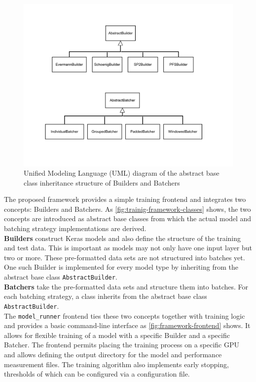 \begin{figure}
    \centering
    \includegraphics[width=\textwidth]{gfx/training-framework-classes.pdf}
    \caption[UML diagram of the framework classes]{Unified Modeling Language (UML) diagram of the abstract base class inheritance structure of Builders and Batchers}
    \label{fig:trainig-framework-classes}
\end{figure}

The proposed framework provides a simple training frontend and integrates two concepts: Builders and Batchers. As \autoref{fig:trainig-framework-classes} shows, the two concepts are introduced as abstract base classes from which the actual model and batching strategy implementations are derived.\\

\noindent\textbf{Builders} construct Keras models and also define the structure of the training and test data. This is important as models may not only have one input layer but two or more. These pre-formatted data sets are not structured into batches yet. One such Builder is implemented for every model type by inheriting from the abstract base class \verb=AbstractBuilder=.\\

\noindent\textbf{Batchers} take the pre-formatted data sets and structure them into batches. For each batching strategy, a class inherits from the abstract base class \verb=AbstractBuilder=.\\

\noindent The \verb=model_runner= frontend ties these two concepts together with training logic and provides a basic command-line interface as \autoref{fig:framework-frontend} shows. It allows for flexible training of a model with a specific Builder and a specific Batcher. The frontend permits placing the training process on a specific GPU and allows defining the output directory for the model and performance measurement files. The training algorithm also implements early stopping, thresholds of which can be configured via a configuration file.\\

